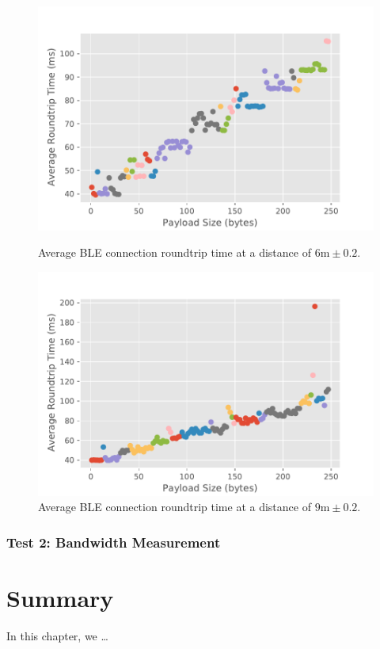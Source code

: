 \begin{figure}[H]
    \begin{minipage}[r]{0.49\linewidth}
    \centering
    \includegraphics[width=\linewidth]{images/ble-roundtrip-hci0-600cm.pdf}
    \caption[Average \acs{BLE} connection roundtrip time at a distance of 6m.]{Average \acs{BLE} connection roundtrip time at a distance of $6\text{m} \pm 0.2$.}
    \label{fig:ble-roundtrip-6cm}
    \end{minipage}
    \begin{minipage}[l]{0.49\linewidth}
        \centering
        \includegraphics[width=\linewidth]{images/ble-roundtrip-hci0-900cm.pdf}
        \caption[Average roundtrip time obtained at a distance of 9m using \acs{BLE} connection.]{Average \acs{BLE} connection roundtrip time at a distance of $9\text{m} \pm 0.2$.}
        \label{fig:ble-roundtrip-9cm}
        \end{minipage}
\end{figure}

\subsubsection{Test 2: Bandwidth Measurement}


\section{Summary}
In this chapter, we \dots